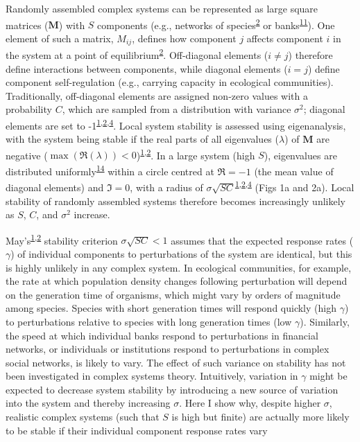\documentclass[]{article}
\begin{document}
Randomly assembled complex systems can be represented as large square
matrices (\(\mathbf{M}\)) with \(S\) components (e.g., networks of
species\textsuperscript{\protect\hyperlink{ref-Allesina2012}{2}} or
banks\textsuperscript{\protect\hyperlink{ref-Haldane2011}{11}}). One
element of such a matrix, \(M_{ij}\), defines how component \(j\)
affects component \(i\) in the system at a point of
equilibrium\textsuperscript{\protect\hyperlink{ref-Allesina2012}{2}}.
Off-diagonal elements (\(i \neq j\)) therefore define interactions
between components, while diagonal elements (\(i = j\)) define component
self-regulation (e.g., carrying capacity in ecological communities).
Traditionally, off-diagonal elements are assigned non-zero values with a
probability \(C\), which are sampled from a distribution with variance
\(\sigma^{2}\); diagonal elements are set to
-1\textsuperscript{\protect\hyperlink{ref-May1972}{1},\protect\hyperlink{ref-Allesina2012}{2},\protect\hyperlink{ref-Allesina2015}{4}}.
Local system stability is assessed using eigenanalysis, with the system
being stable if the real parts of all eigenvalues (\(\lambda\)) of
\(\mathbf{M}\) are negative
(\(\max\left(\Re(\lambda)\right) < 0\))\textsuperscript{\protect\hyperlink{ref-May1972}{1},\protect\hyperlink{ref-Allesina2012}{2}}.
In a large system (high \(S\)), eigenvalues are distributed
uniformly\textsuperscript{\protect\hyperlink{ref-Tao2010}{14}} within a
circle centred at \(\Re = -1\) (the mean value of diagonal elements) and
\(\Im = 0\), with a radius of
\(\sigma\sqrt{SC}\)\textsuperscript{\protect\hyperlink{ref-May1972}{1},\protect\hyperlink{ref-Allesina2012}{2},\protect\hyperlink{ref-Allesina2015}{4}}
(Figs 1a and 2a). Local stability of randomly assembled systems
therefore becomes increasingly unlikely as \(S\), \(C\), and
\(\sigma^{2}\) increase.

May's\textsuperscript{\protect\hyperlink{ref-May1972}{1},\protect\hyperlink{ref-Allesina2012}{2}}
stability criterion \(\sigma\sqrt{SC} < 1\) assumes that the expected
response rates (\(\gamma\)) of individual components to perturbations of
the system are identical, but this is highly unlikely in any complex
system. In ecological communities, for example, the rate at which
population density changes following perturbation will depend on the
generation time of organisms, which might vary by orders of magnitude
among species. Species with short generation times will respond quickly
(high \(\gamma\)) to perturbations relative to species with long
generation times (low \(\gamma\)). Similarly, the speed at which
individual banks respond to perturbations in financial networks, or
individuals or institutions respond to perturbations in complex social
networks, is likely to vary. The effect of such variance on stability
has not been investigated in complex systems theory. Intuitively,
variation in \(\gamma\) might be expected to decrease system stability
by introducing a new source of variation into the system and thereby
increasing \(\sigma\). Here I show why, despite higher \(\sigma\),
realistic complex systems (such that \(S\) is high but finite) are
actually more likely to be stable if their individual component response
rates vary
\end{document}

